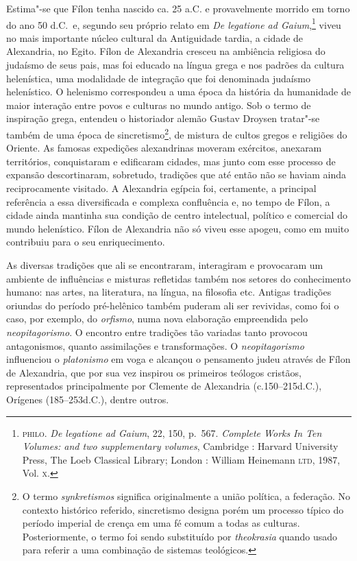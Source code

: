 Estima"-se que Fílon tenha nascido ca. 25 a.C. e provavelmente
morrido em torno do ano 50 d.C.~e, segundo seu próprio relato em
\emph{De legatione ad Gaium},\footnote{ \textsc{philo}.
\emph{De legatione ad Gaium}, 22, 150, p.~567. \emph{Complete
Works} \emph{In Ten Volumes: and two supplementary volumes},
Cambridge : Harvard University Press, The Loeb Classical
Library; London : William Heinemann \textsc{ltd}, 1987, Vol.
\textsc{x}.}
viveu no mais importante núcleo cultural da Antiguidade tardia,
a cidade de Alexandria, no Egito. Fílon de Alexandria cresceu na
ambiência religiosa do judaísmo de seus pais, mas foi educado na
língua grega e nos padrões da cultura helenística, uma
modalidade de integração que foi denominada judaísmo
helenístico. O helenismo correspondeu a uma época da história da
humanidade de maior interação entre povos e culturas no mundo
antigo. Sob o termo de inspiração grega, entendeu o historiador
alemão Gustav Droysen tratar"-se também de uma época de
sincretismo\footnote{ O termo
\emph{synkretismos} significa originalmente a união política,
a federação. No contexto histórico referido, sincretismo designa
porém um processo típico do período imperial de crença em uma fé
comum a todas as culturas. Posteriormente, o termo foi sendo
substituído por \emph{theokrasia} quando usado para referir a
uma combinação de sistemas teológicos.}, de mistura de cultos
gregos e religiões do Oriente. As famosas expedições
alexandrinas moveram exércitos, anexaram territórios,
conquistaram e edificaram cidades, mas junto com esse processo
de expansão descortinaram, sobretudo, tradições que até então
não se haviam ainda reciprocamente visitado. A Alexandria
egípcia foi, certamente, a principal referência a essa
diversificada e complexa confluência e, no tempo de Fílon, a
cidade ainda mantinha sua condição de centro intelectual,
político e comercial do mundo helenístico. Fílon de Alexandria
não só viveu esse apogeu, como em muito contribuiu para o seu
enriquecimento.

As diversas tradições que ali se encontraram, interagiram e
provocaram um ambiente de influências e misturas refletidas
também nos setores do conhecimento humano: nas artes, na
literatura, na língua, na filosofia etc. Antigas tradições
oriundas do período pré-helênico também puderam ali ser
revividas, como foi o caso, por exemplo, do \emph{orfismo},
numa nova elaboração empreendida pelo \emph{neopitagorismo}. O
encontro entre tradições tão variadas tanto provocou
antagonismos, quanto assimilações e transformações. O
\emph{neopitagorismo} influenciou o \emph{platonismo} em
voga e alcançou o pensamento judeu através de Fílon de
Alexandria, que por sua vez inspirou os primeiros teólogos
cristãos, representados principalmente por Clemente de
Alexandria (c.150--215d.C.), Orígenes (185--253d.C.), dentre
outros.

